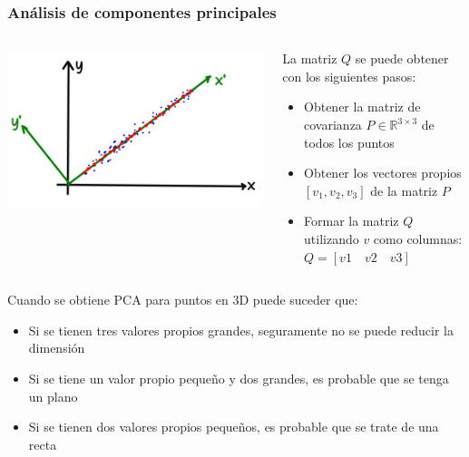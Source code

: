 \begin{frame}\frametitle{Análisis de componentes principales}
  \begin{columns}
    \begin{column}{0.4\textwidth}
      \includegraphics[width=\textwidth]{Figures/PCA1.png}
    \end{column}
    \begin{column}{0.6\textwidth}
      La matriz $Q$ se puede obtener con los siguientes pasos:
      \begin{itemize}
      \item Obtener la matriz de covarianza $P\in\mathbb{R}^{3\times 3}$ de todos los puntos
      \item Obtener los vectores propios $[v_1, v_2, v_3]$ de la matriz $P$
      \item Formar la matriz $Q$ utilizando $v$ como columnas: $Q= [v1\quad v2\quad v3]$
      \end{itemize}
    \end{column}
  \end{columns}
  Cuando se obtiene PCA para puntos en 3D puede suceder que:
  \begin{itemize}
  \item Si se tienen tres valores propios grandes, seguramente no se puede reducir la dimensión
  \item Si se tiene un valor propio pequeño y dos grandes, es probable que se tenga un plano
  \item Si se tienen dos valores propios pequeños, es probable que se trate de una recta 
  \end{itemize}
\end{frame}

